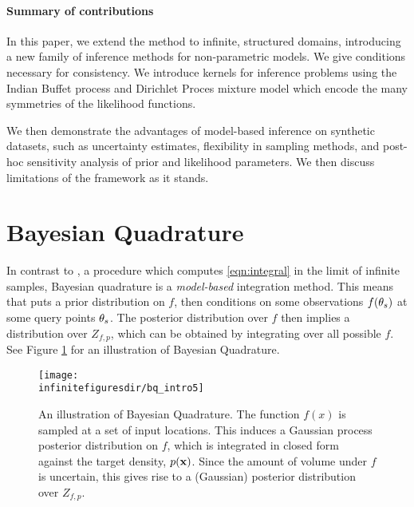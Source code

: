 \paragraph{Summary of contributions} In this paper, we extend the \bq{} method to infinite, structured domains, introducing a new family of inference methods for non-parametric models.  We give conditions necessary for consistency.  We introduce kernels for inference problems using the Indian Buffet process and Dirichlet Proces mixture model which encode the many symmetries of the likelihood functions.

We then demonstrate the advantages of model-based inference on synthetic datasets, such as uncertainty estimates, flexibility in sampling methods, and post-hoc sensitivity analysis of prior and likelihood parameters.  We then discuss limitations of the framework as it stands.

\section{Bayesian Quadrature}

In contrast to \mcmc{}, a procedure which computes \eqref{eqn:integral} in the limit of infinite samples, Bayesian quadrature is a \emph{model-based} integration method.  This means that \bq{} puts a prior distribution on $f$, then conditions on some observations $f({\bf{\theta}}_s)$ at some query points ${\bf{\theta}}_s$.  The posterior distribution over $f$ then implies a distribution over $Z_{f,p}$, which can be obtained by integrating over all possible $f$.  See Figure \ref{fig:bq_intro} for an illustration of Bayesian Quadrature.

\begin{figure}
\centering
\texttt{[image: \\infinitefiguresdir/bq\_intro5]}
\caption{An illustration of Bayesian Quadrature.  The function $f(x)$ is sampled at a set of input locations.  This induces a Gaussian process posterior distribution on $f$, which is integrated in closed form against the target density, $p({\bf{x}})$.  Since the amount of volume under $f$ is uncertain, this gives rise to a (Gaussian) posterior distribution over $Z_{f,p}$.}
\label{fig:bq_intro}
\end{figure}

